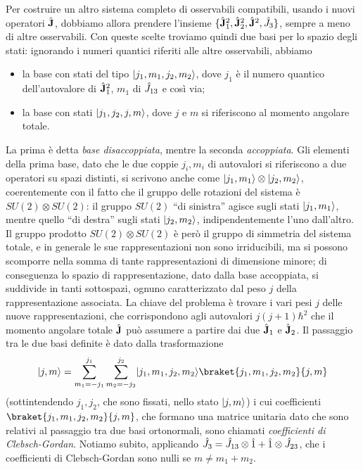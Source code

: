 Per costruire un altro sistema completo di osservabili compatibili, usando i nuovi operatori $\hat{\mathbf{J}}$, dobbiamo allora prendere l'insieme $\{\hat{\mathbf{J}}_1^2,\hat{\mathbf{J}}_2^2,\hat{\mathbf{J}}^2,\hat{J}_3\}$, sempre a meno di altre osservabili.
Con queste scelte troviamo quindi due basi per lo spazio degli stati: ignorando i numeri quantici riferiti alle altre osservabili, abbiamo
\begin{itemize}
	\item la base con stati del tipo $\lvert j_1,m_1,j_2,m_2\rangle$, dove $j_1$ è il numero quantico dell'autovalore di $\hat{\mathbf{J}}_1^2$, $m_1$ di $\hat{J}_{13}$ e cos\`i via;
	\item la base con stati $\lvert j_1,j_2,j,m\rangle$, dove $j$ e $m$ si riferiscono al momento angolare totale.
\end{itemize}
La prima è detta \emph{base disaccoppiata}, mentre la seconda \emph{accoppiata}.
Gli elementi della prima base, dato che le due coppie $j_i,m_i$ di autovalori si riferiscono a due operatori su spazi distinti, si scrivono anche come $\lvert j_1,m_1\rangle\otimes\lvert j_2,m_2\rangle$, coerentemente con il fatto che il gruppo delle rotazioni del sistema è $SU(2)\otimes SU(2)$: il gruppo $SU(2)$ ``di sinistra'' agisce sugli stati $\lvert j_1,m_1\rangle$, mentre quello ``di destra'' sugli stati $\lvert j_2,m_2\rangle$, indipendentemente l'uno dall'altro.
Il gruppo prodotto $SU(2)\otimes SU(2)$ è però il gruppo di simmetria del sistema totale, e in generale le sue rappresentazioni non sono irriducibili, ma si possono scomporre nella somma di tante rappresentazioni di dimensione minore; di conseguenza lo spazio di rappresentazione, dato dalla base accoppiata, si suddivide in tanti sottospazi, ognuno caratterizzato dal peso $j$ della rappresentazione associata.
La chiave del problema è trovare i vari pesi $j$ delle nuove rappresentazioni, che corrispondono agli autovalori $j(j+1)\hbar^2$ che il momento angolare totale $\hat{\mathbf{J}}$ può assumere a partire dai due $\hat{\mathbf{J}}_1$ e $\hat{\mathbf{J}}_2$.
Il passaggio tra le due basi definite è dato dalla trasformazione
\begin{equation}
    \ket{j,m}=\sum_{m_1=-j_1}^{j_1}\sum_{m_2=-j_2}^{j_2}\ket{j_1,m_1,j_2,m_2}\braket{j_1,m_1,j_2,m_2}{j,m}
	\label{eq:sviluppo-clebsch-gordan}
\end{equation}
(sottintendendo $j_1,j_2$, che sono fissati, nello stato $\lvert j,m\rangle$) i cui coefficienti $\braket{j_1,m_1,j_2,m_2}{j,m}$, che formano una matrice unitaria dato che sono relativi al passaggio tra due basi ortonormali, sono chiamati \emph{coefficienti di Clebsch-Gordan}.
Notiamo subito, applicando $\hat{J}_3=\hat{J}_{13}\otimes\hat{1}+\hat{1}\otimes\hat{J}_{23}$, che i coefficienti di Clebsch-Gordan sono nulli se $m\ne m_1+m_2$.

